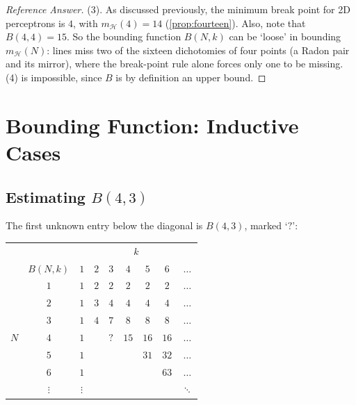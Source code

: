 \begin{proof}[Reference Answer]
    (3). As discussed previously, the minimum break point for 2D perceptrons
    is \(4\), with \(m_{\mathcal{H}}(4) = 14\) (\autoref{prop:fourteen}).
    Also, note that \(B(4, 4) = 15\). So the bounding function \(B(N, k)\) can
    be `loose' in bounding \(m_{\mathcal{H}}(N)\): lines miss two of the
    sixteen dichotomies of four points (a Radon pair and its mirror), where
    the break-point rule alone forces only one to be missing. (4) is
    impossible, since \(B\) is by definition an upper bound.
\end{proof}

\section{Bounding Function: Inductive Cases}\label{sec:bound-inductive}


\subsection{Estimating \texorpdfstring{\(B(4, 3)\)}{B(4, 3)}}

The first unknown entry below the diagonal is \(B(4, 3)\), marked `\(?\)':

\begin{center}
    \solidrules
    \setlength{\extrarowheight}{0.2ex}
    \begin{tabular}{@{}cc|ccccccc@{}}
        \toprule
        & & \multicolumn{7}{c}{\(k\)}\\
        & \(B(N, k)\) & \(1\) & \(2\) & \(3\) & \(4\) & \(5\) & \(6\)
        & \(\dots\)\\
        \midrule
        & \(1\) & \(1\) & \(2\) & \(2\) & \(2\) & \(2\) & \(2\) & \(\dots\)\\
        & \(2\) & \(1\) & \(3\) & \(4\) & \(4\) & \(4\) & \(4\) & \(\dots\)\\
        & \(3\) & \(1\) & \(4\) & \(7\) & \(8\) & \(8\) & \(8\) & \(\dots\)\\
        \(N\) & \(4\) & \(1\) & & \textcolor{orange!85!black}{\(\bm{?}\)}
        & \(15\) & \(16\) & \(16\) & \(\dots\)\\
        & \(5\) & \(1\) & & & & \(31\) & \(32\) & \(\dots\)\\
        & \(6\) & \(1\) & & & & & \(63\) & \(\dots\)\\
        & \(\vdots\) & \(\vdots\) & & & & & & \(\ddots\)\\
        \bottomrule
    \end{tabular}
\end{center}

